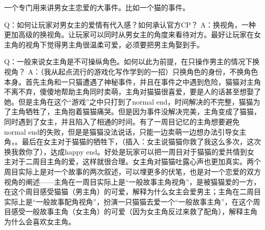 一个专门用来讲男女主恋爱的大事件。比如一个猫的事件。

Q：如何让玩家对男女主的爱情有代入感？如何承认官方CP？
A：换视角，一种更加高级的换视角。让玩家可以同时从男女主的角度来看待对方。最好让玩家在女主角的视角下觉得男主角很温柔可爱，必须要把男主角娶到手。

Q：一般来说女主角是不可操纵角色。如何以此为前提，在只操作男主的情况下换视角？
A：（我从起点流行的游戏化写作学到的一招）只换角色的身份，不换角色本身。首先主角和一只猫遭遇了神秘事件，并且在事件之中遇到危险，猫猫对主角不离不弃，傻傻地帮助主角同时卖萌，主角对猫猫很喜爱，要是人的话甚至想娶了她。但是主角在这个“游戏”之中只打到了normal end，时间解决的不完整，猫猫为了主角牺牲了，主角抱着猫猫痛哭。但是因为事件没解决完美，主角变成了猫猫，同时遇到了女主，并且陷入了相通的时间。有了一周目记忆的主角想要避免normal end的失败，但是是猫猫没法说话，只能一边卖萌一边想办法引导女主角，。最后在女主对于猫猫的牺牲下，（插入：女主说猫猫你救了我这么多次，这次换我救你了），达成happy end。好处是玩家可以把一周目对于猫猫的爱共情到女主对于二周目主角的爱，这样就很合理。女主角对猫猫吐露心声也更加真实。两个周目实际上是对一个故事的两次叙述，可以埋更多的伏笔，也是对一个恋爱的双方视角的阐述——主角在一周目实际上是“一般故事主角视角”，是被猫猫爱的一方，在这个周目感受猫猫（男主角）的可爱，解释为什么女主会爱男主；主角在二周目实际上是“一般故事配角视角”，扮演一只猫猫去爱一个“一般故事主角”，在这个周目感受一般故事主角（女主角）的可爱（因为女主角反过来救了配角），解释主角为什么会喜欢女主角。
